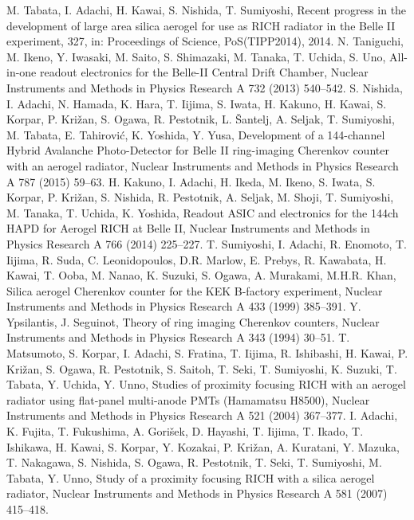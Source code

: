 \documentclass[5p,twocolumn]{elsarticle}
\begin{document}
\begin{thebibliography}{00}
M. Tabata, I. Adachi, H. Kawai, S. Nishida, T. Sumiyoshi, Recent progress in the development of large area silica aerogel for use as RICH radiator in the Belle II experiment, 327, in: Proceedings of Science, PoS(TIPP2014), 2014.
N. Taniguchi, M. Ikeno, Y. Iwasaki, M. Saito, S. Shimazaki, M. Tanaka, T. Uchida, S. Uno, All-in-one readout electronics for the Belle-II Central Drift Chamber, Nuclear Instruments and Methods in Physics Research A 732 (2013) 540--542.
S. Nishida, I. Adachi, N. Hamada, K. Hara, T. Iijima, S. Iwata, H. Kakuno, H. Kawai, S. Korpar, P. Kri\v{z}an, S. Ogawa, R. Pestotnik, L. \v{S}antelj, A. Seljak, T. Sumiyoshi, M. Tabata, E. Tahirovi\'{c}, K. Yoshida, Y. Yusa, Development of a 144-channel Hybrid Avalanche Photo-Detector for Belle II ring-imaging Cherenkov counter with an aerogel radiator, Nuclear Instruments and Methods in Physics Research A 787 (2015) 59--63.
H. Kakuno, I. Adachi, H. Ikeda, M. Ikeno, S. Iwata, S. Korpar, P. Kri\v{z}an, S. Nishida, R. Pestotnik, A. Seljak, M. Shoji, T. Sumiyoshi, M. Tanaka, T. Uchida, K. Yoshida, Readout ASIC and electronics for the 144ch HAPD for Aerogel RICH at Belle II, Nuclear Instruments and Methods in Physics Research A 766 (2014) 225--227.
T. Sumiyoshi, I. Adachi, R. Enomoto, T. Iijima, R. Suda, C. Leonidopoulos, D.R. Marlow, E. Prebys, R. Kawabata, H. Kawai, T. Ooba, M. Nanao, K. Suzuki, S. Ogawa, A. Murakami, M.H.R. Khan, Silica aerogel Cherenkov counter for the KEK B-factory experiment, Nuclear Instruments and Methods in Physics Research A 433 (1999) 385--391.
Y. Ypsilantis, J. Seguinot, Theory of ring imaging Cherenkov counters, Nuclear Instruments and Methods in Physics Research A 343 (1994) 30--51.
T. Matsumoto, S. Korpar, I. Adachi, S. Fratina, T. Iijima, R. Ishibashi, H. Kawai, P. Kri\v{z}an, S. Ogawa, R. Pestotnik, S. Saitoh, T. Seki, T. Sumiyoshi, K. Suzuki, T. Tabata, Y. Uchida, Y. Unno, Studies of proximity focusing RICH with an aerogel radiator using flat-panel multi-anode PMTs (Hamamatsu H8500), Nuclear Instruments and Methods in Physics Research A 521 (2004) 367--377.
I. Adachi, K. Fujita, T. Fukushima, A. Gori\v{s}ek, D. Hayashi, T. Iijima, T. Ikado, T. Ishikawa, H. Kawai, S. Korpar, Y. Kozakai, P. Kri\v{z}an, A. Kuratani, Y. Mazuka, T. Nakagawa, S. Nishida, S. Ogawa, R. Pestotnik, T. Seki, T. Sumiyoshi, M. Tabata, Y. Unno, Study of a proximity focusing RICH with a silica aerogel radiator, Nuclear Instruments and Methods in Physics Research A 581 (2007) 415--418.

\end{thebibliography}
\end{document}
